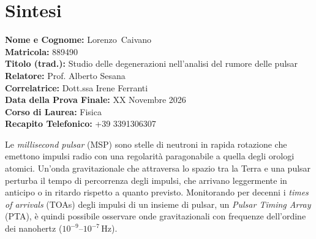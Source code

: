 \documentclass[12pt]{report}
\newcommand{\cognomeIT}{Caivano}
\newcommand{\nomeIT}{Lorenzo}
\newcommand{\matricolaIT}{889490}
\newcommand{\titoloTesiIT}{Studio delle degenerazioni nell'analisi del rumore delle pulsar}
\newcommand{\relatoreIT}{Prof. Alberto Sesana}
\newcommand{\correlatoreIT}{Dott.ssa Irene Ferranti}
\newcommand{\dataSedutaIT}{XX Novembre 2026}
\newcommand{\corsoDiLaureaIT}{Fisica}
\newcommand{\recapitoTelefonicoIT}{+39 3391306307}
\begin{document}
\thispagestyle{empty}

\chapter*{Sintesi}
\begin{center}
\textbf{Nome e Cognome:} \nomeIT \, \cognomeIT \\[0.3cm]
\textbf{Matricola:} \matricolaIT \\[0.3cm]
\textbf{Titolo (trad.):} \titoloTesiIT \\[0.3cm]
\textbf{Relatore:} \relatoreIT \\[0.3cm]
\textbf{Correlatrice:} \correlatoreIT \\[0.3cm]
\textbf{Data della Prova Finale:} \dataSedutaIT \\[0.3cm]
\textbf{Corso di Laurea:} \corsoDiLaureaIT \\[0.3cm]
\textbf{Recapito Telefonico:} \recapitoTelefonicoIT \\
\end{center}

\vspace{1cm}
\sloppy



\noindent
Le \textit{millisecond pulsar} (MSP) sono stelle di neutroni in rapida rotazione che
emettono impulsi radio con una regolarità paragonabile a quella degli orologi
atomici. Un'onda gravitazionale che attraversa lo spazio tra la Terra e una pulsar
perturba il tempo di percorrenza degli impulsi, che arrivano leggermente in
anticipo o in ritardo rispetto a quanto previsto. Monitorando per decenni i
\textit{times of arrivals} (TOAs) degli impulsi di un insieme di pulsar, un \textit{Pulsar Timing
Array} (PTA), è quindi possibile osservare onde gravitazionali con frequenze
dell'ordine dei nanohertz ($10^{-9}$--$10^{-7}$\,Hz). \par
\end{document}
